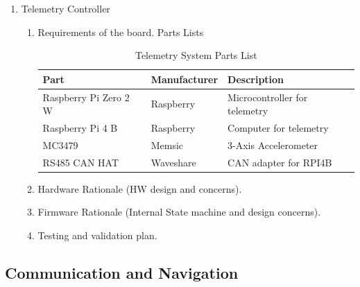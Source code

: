 \begin{enumerate}
        \item Telemetry Controller
        \begin{enumerate}
            \item Requirements of the board.
            Parts Lists
                \begin{table}[H]
                    \centering
                    \begin{tabular}{|l|l|l|}
                    \hline
                    \textbf{Part} & \textbf{Manufacturer} & \textbf{Description} \\ \hline
                    Raspberry Pi Zero 2 W & Raspberry & Microcontroller for telemetry \\ \hline
                    Raspberry Pi 4 B & Raspberry & Computer for telemetry \\ \hline
                    MC3479 & Memsic & 3-Axis Accelerometer \\ \hline
                    RS485 CAN HAT & Waveshare & CAN adapter for RPI4B \\ \hline
                    \end{tabular}
                    \caption{Telemetry System Parts List}
                    \label{tab:my-table}
                \end{table}
            \item Hardware Rationale (HW design and concerns).
            
            \item Firmware Rationale (Internal State machine and design concerns).

            \item Testing and validation plan.
        \end{enumerate}
\end{enumerate}

\subsection{Communication and Navigation}
